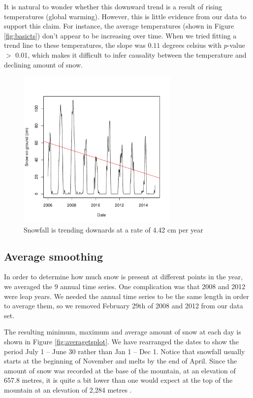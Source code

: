 \documentclass[12pt,twoside]{article}
\begin{document}
{It is natural to wonder whether this downward trend is a result of rising temperatures (global warming). However, this is little evidence from our data to support this claim. For instance, the average temperatures (shown in Figure \ref{fig:basicts}) don't appear to be increasing  over time. When we tried fitting a trend line to these temperatures, the slope was $0.11$ degrees celsius with $p$-value $>$ 0.01, which makes it difficult to infer causality between the temperature and declining amount of snow.


\begin{figure}[!ht]
\begin{center}
\includegraphics[width=0.7\textwidth]{report-snowtrend}
\end{center}
\vspace{-5mm}
\caption{Snowfall is trending downards at a rate of 4.42 cm per year}
\label{fig:snowtrend}
\end{figure}

\subsection{Average smoothing}

In order to determine how much snow is present at different points in the year, we averaged the 9 annual time series. One complication was that 2008 and 2012 were leap years. We needed the annual time series to be the same length in order to average them, so we removed February 29th of 2008 and 2012 from our data set.

The resulting minimum, maximum and average amount of snow at each day is shown in Figure \ref{fig:averagetsplot}. We have rearranged the dates to show the period July 1 -- June 30 rather than Jan 1 -- Dec 1. Notice that snowfall usually starts at the beginning of November and melts by the end of April. Since the amount of snow was recorded at the base of the mountain, at an elevation of 657.8 metres, it is quite a bit lower than one would expect at the top of the mountain at an elevation of 2,284 metres \cite{WhistlerBlackcomb}.

}
\end{document}
